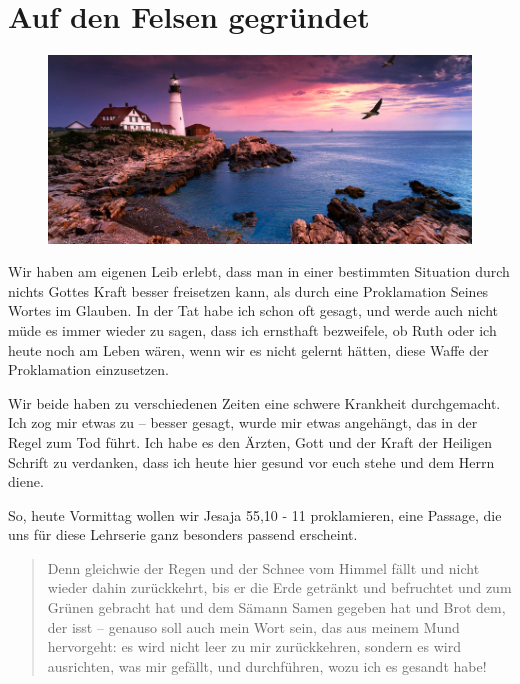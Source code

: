 \chapter{Auf den Felsen gegründet}

\begin{figure}[h]
  \includegraphics[width=\textwidth]{auf-den-felsen-gegruendet/teaser.jpg}
  \centering
\end{figure}

Wir haben am eigenen Leib erlebt, dass man in einer bestimmten Situation durch nichts Gottes Kraft besser freisetzen kann, als durch eine Proklamation Seines Wortes im Glauben. 
In der Tat habe ich schon oft gesagt, und werde auch nicht müde es immer wieder zu sagen, dass ich ernsthaft bezweifele, ob Ruth oder ich heute noch am Leben wären, wenn wir es nicht gelernt hätten, diese Waffe der Proklamation einzusetzen.

Wir beide haben zu verschiedenen Zeiten eine schwere Krankheit durchgemacht.
Ich zog mir etwas zu – besser gesagt, wurde mir etwas angehängt, das in der Regel zum Tod führt.
Ich habe es den Ärzten, Gott und der Kraft der Heiligen Schrift zu verdanken, dass ich heute hier gesund vor euch stehe und dem Herrn diene.

So, heute Vormittag wollen wir Jesaja 55,10 - 11 proklamieren, eine Passage, die uns für diese Lehrserie ganz besonders passend erscheint.

\begin{quotation}
  Denn gleichwie der Regen und der Schnee vom Himmel fällt und nicht wieder dahin zurückkehrt, bis er die Erde getränkt und befruchtet und zum Grünen gebracht hat und dem Sämann Samen gegeben hat und Brot dem, der isst – genauso soll auch mein Wort sein, das aus meinem Mund hervorgeht: es wird nicht leer zu mir zurückkehren, sondern es wird ausrichten, was mir gefällt, und durchführen, wozu ich es gesandt habe!
\end{quotation}

